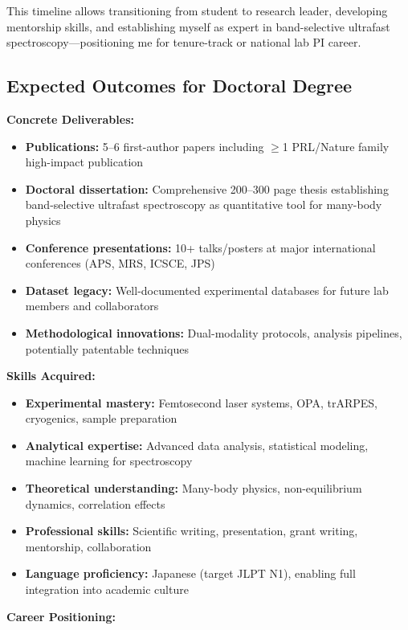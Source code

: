 \documentclass[12pt,a4paper]{article}
\begin{document}
This timeline allows transitioning from student to research leader, developing mentorship skills, and establishing myself as expert in band-selective ultrafast spectroscopy—positioning me for tenure-track or national lab PI career.

\subsection{Expected Outcomes for Doctoral Degree}

\textbf{Concrete Deliverables:}
\begin{itemize}
    \item \textbf{Publications:} 5--6 first-author papers including $\geq$1 PRL/Nature family high-impact publication
    \item \textbf{Doctoral dissertation:} Comprehensive 200--300 page thesis establishing band-selective ultrafast spectroscopy as quantitative tool for many-body physics
    \item \textbf{Conference presentations:} 10+ talks/posters at major international conferences (APS, MRS, ICSCE, JPS)
    \item \textbf{Dataset legacy:} Well-documented experimental databases for future lab members and collaborators
    \item \textbf{Methodological innovations:} Dual-modality protocols, analysis pipelines, potentially patentable techniques
\end{itemize}

\textbf{Skills Acquired:}
\begin{itemize}
    \item \textbf{Experimental mastery:} Femtosecond laser systems, OPA, trARPES, cryogenics, sample preparation
    \item \textbf{Analytical expertise:} Advanced data analysis, statistical modeling, machine learning for spectroscopy
    \item \textbf{Theoretical understanding:} Many-body physics, non-equilibrium dynamics, correlation effects
    \item \textbf{Professional skills:} Scientific writing, presentation, grant writing, mentorship, collaboration
    \item \textbf{Language proficiency:} Japanese (target JLPT N1), enabling full integration into academic culture
\end{itemize}

\textbf{Career Positioning:}
\end{document}
